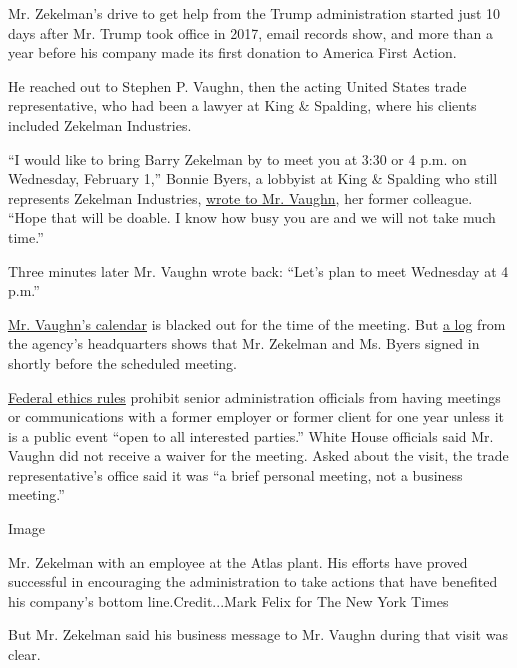 Mr. Zekelman's drive to get help from the Trump administration started
just 10 days after Mr. Trump took office in 2017, email records show,
and more than a year before his company made its first donation to
America First Action.

He reached out to Stephen P. Vaughn, then the acting United States trade
representative, who had been a lawyer at King \& Spalding, where his
clients included Zekelman Industries.

``I would like to bring Barry Zekelman by to meet you at 3:30 or 4 p.m.
on Wednesday, February 1,'' Bonnie Byers, a lobbyist at King \& Spalding
who still represents Zekelman Industries,
\href{https://www.documentcloud.org/documents/6015721-Zekelman-Visit-With-Acting-United-States-Trade.html\#document/p1/a501810}{wrote
to Mr. Vaughn}, her former colleague. ``Hope that will be doable. I know
how busy you are and we will not take much time.''

Three minutes later Mr. Vaughn wrote back: ``Let's plan to meet
Wednesday at 4 p.m.''

\href{https://www.documentcloud.org/documents/6015721-Zekelman-Visit-With-Acting-United-States-Trade.html\#document/p4/a501811}{Mr.
Vaughn's calendar} is blacked out for the time of the meeting. But
\href{https://www.documentcloud.org/documents/6015721-Zekelman-Visit-With-Acting-United-States-Trade.html\#document/p5/a501812}{a
log} from the agency's headquarters shows that Mr. Zekelman and Ms.
Byers signed in shortly before the scheduled meeting.

\href{https://www.documentcloud.org/documents/6015721-Zekelman-Visit-With-Acting-United-States-Trade.html\#document/p12/a501815}{Federal
ethics rules} prohibit senior administration officials from having
meetings or communications with a former employer or former client for
one year unless it is a public event ``open to all interested parties.''
White House officials said Mr. Vaughn did not receive a waiver for the
meeting. Asked about the visit, the trade representative's office said
it was ``a brief personal meeting, not a business meeting.''

Image

Mr. Zekelman with an employee at the Atlas plant. His efforts have
proved successful in encouraging the administration to take actions that
have benefited his company's bottom line.Credit...Mark Felix for The New
York Times

But Mr. Zekelman said his business message to Mr. Vaughn during that
visit was clear.

